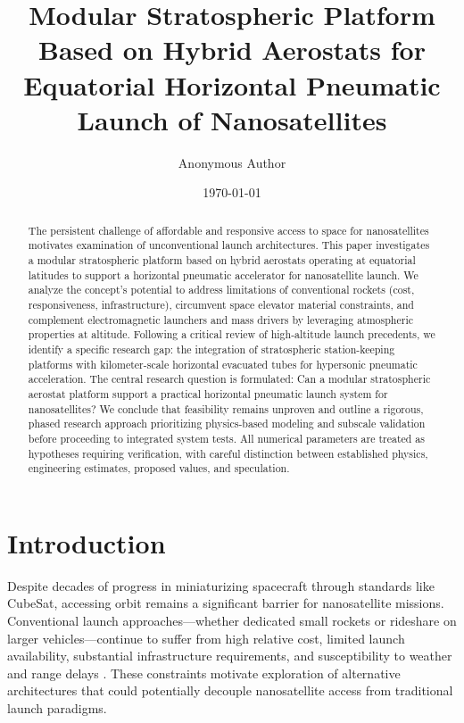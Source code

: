 \documentclass[12pt]{article}
\title{Modular Stratospheric Platform Based on Hybrid Aerostats for Equatorial Horizontal Pneumatic Launch of Nanosatellites}
\author{Anonymous Author}
\date{\today}
\begin{document}
\maketitle

\begin{abstract}
The persistent challenge of affordable and responsive access to space for nanosatellites motivates examination of unconventional launch architectures. This paper investigates a modular stratospheric platform based on hybrid aerostats operating at equatorial latitudes to support a horizontal pneumatic accelerator for nanosatellite launch. We analyze the concept's potential to address limitations of conventional rockets (cost, responsiveness, infrastructure), circumvent space elevator material constraints, and complement electromagnetic launchers and mass drivers by leveraging atmospheric properties at altitude. Following a critical review of high-altitude launch precedents, we identify a specific research gap: the integration of stratospheric station-keeping platforms with kilometer-scale horizontal evacuated tubes for hypersonic pneumatic acceleration. The central research question is formulated: Can a modular stratospheric aerostat platform support a practical horizontal pneumatic launch system for nanosatellites? We conclude that feasibility remains unproven and outline a rigorous, phased research approach prioritizing physics-based modeling and subscale validation before proceeding to integrated system tests. All numerical parameters are treated as hypotheses requiring verification, with careful distinction between established physics, engineering estimates, proposed values, and speculation.
\end{abstract}


\section{Introduction}
Despite decades of progress in miniaturizing spacecraft through standards like CubeSat, accessing orbit remains a significant barrier for nanosatellite missions. Conventional launch approaches—whether dedicated small rockets or rideshare on larger vehicles—continue to suffer from high relative cost, limited launch availability, substantial infrastructure requirements, and susceptibility to weather and range delays \cite{wertz2018}. These constraints motivate exploration of alternative architectures that could potentially decouple nanosatellite access from traditional launch paradigms.
\end{document}
